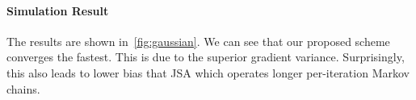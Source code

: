 \paragraph{Simulation Result}
The results are shown in~\cref{fig:gaussian}.
We can see that our proposed scheme converges the fastest.
This is due to the superior gradient variance.
Surprisingly, this also leads to lower bias that JSA which operates longer per-iteration Markov chains.






